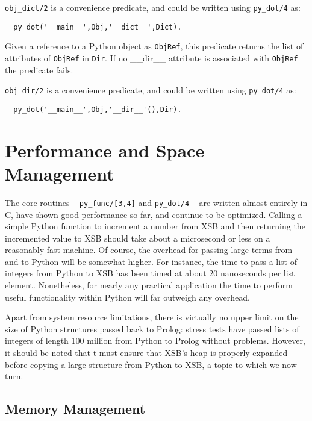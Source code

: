 \begin{description}
{\tt obj\_dict/2} is a convenience predicate, and could be written
using {\tt py\_dot/4} as:

\begin{verbatim}
  py_dot('__main__',Obj,'__dict__',Dict).
\end{verbatim}

%
Given a reference to a Python object as {\tt ObjRef}, this predicate
returns the list of attributes of {\tt ObjRef} in {\tt Dir}.  If no
\_\_dir\_\_ attribute is associated with {\tt ObjRef} the predicate
fails.

{\tt obj\_dir/2} is a convenience predicate, and could be written
using {\tt py\_dot/4} as:

\begin{verbatim}
  py_dot('__main__',Obj,'__dir__'(),Dir).
\end{verbatim}

\end{description}

\section{Performance and Space Management} \label{sec:jns-perf}

The core \janus{} routines -- {\tt py\_func/[3,4]} and {\tt py\_dot/4}
-- are written almost entirely in C, have shown good performance so
far, and continue to be optimized.  Calling a simple Python function
to increment a number from XSB and then returning the incremented
value to XSB should take about a microsecond or less on a reasonably
fast machine.  Of course, the overhead for passing large terms from
and to Python will be somewhat higher.  For instance, the time to pass
a list of integers from Python to XSB has been timed at about 20
nanoseconds per list element.  Nonetheless, for nearly any practical
application the time to perform useful functionality within Python
will far outweigh any \janus{} overhead.

Apart from system resource limitations, there is virtually no upper
limit on the size of Python structures passed back to Prolog: stress
tests have passed lists of integers of length 100 million from Python
to Prolog without problems. However, it should be noted that \janus{}t
must ensure that XSB's heap is properly expanded before copying a
large structure from Python to XSB, a topic to which we now turn.

\subsection{Memory Management} \label{sec:janus-memory}

